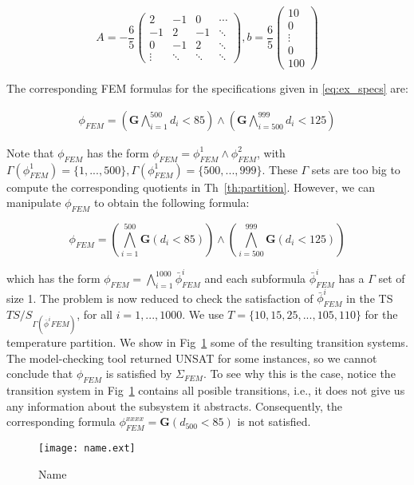 \documentclass{article}
\newcommand{\Always}{\mathbf{G}}
\begin{document}
\begin{equation}
    A = - \frac{6} {5} \begin{pmatrix}
        2 & -1  & 0 & \cdots \\ 
        -1 & 2 & -1 & \ddots \\ 
        0 & -1 & 2 & \ddots \\
        \vdots & \ddots & \ddots & \ddots 
    \end{pmatrix},
    b = \frac{6} {5}\begin{pmatrix}
        10 \\
        0 \\
        \vdots \\
        0 \\
        100
    \end{pmatrix}
\end{equation}

The corresponding FEM formulas for the specifications given in
\eqref{eq:ex_specs} are:

\begin{equation}
    \begin{aligned}
        \phi_{FEM} = (\Always \bigwedge_{i = 1}^{500} d_i < 85) \wedge (\Always
            \bigwedge_{i = 500}^{999} d_i < 125)
    \end{aligned}
\end{equation}

Note that $\phi_{FEM}$ has the form $\phi_{FEM} = \phi^1_{FEM} \wedge
\phi^2_{FEM}$, with $\Gamma(\phi^1_{FEM}) = \{1,...,500\}, \Gamma(\phi^1_{FEM})
= \{500,...,999\}$. These $\Gamma$ sets are too big to compute the corresponding
quotients in Th~\ref{th:partition}. However, we can manipulate $\phi_{FEM}$ to obtain the
following formula:

\begin{equation}
    \phi_{FEM} = (\bigwedge_{i = 1}^{500} \Always (d_i < 85)) \wedge
    (\bigwedge_{i = 500}^{999} \Always (d_i < 125))
\end{equation}

which has the form $\phi_{FEM} = \bigwedge_{i=1}^{1000} \bar{\phi}^i_{FEM}$ and
each subformula $\bar{\phi}^i_{FEM}$ has a $\Gamma$ set of size 1. The problem
is now reduced to check the satisfaction of $\bar{\phi}^i_{FEM}$ in the TS
$TS/S_{\Gamma(\bar{\phi}^i{FEM})}$, for all $i=1,...,1000$. We use $T =
\{10, 15, 25,...,105,110\}$ for the temperature partition. We show in
Fig~\ref{fig:ex_ts} some of the resulting transition systems. The model-checking
tool returned UNSAT for some instances, so we cannot conclude that $\phi_{FEM}$ is
satisfied by $\Sigma_{FEM}$. To see why this is the case, notice the transition
system in Fig~\ref{fig:ex_ts} contains all posible transitions, i.e., it does
not give us any information about the subsystem it abstracts. Consequently, the
corresponding formula $\phi_{FEM}^{xxxx} = \Always (d_{500} < 85)$ is not
satisfied.

\begin{figure}
    \centering
    \texttt{[image: name.ext]}
    \caption{Name}
    \label{fig:ex_ts}
\end{figure}
\end{document}
